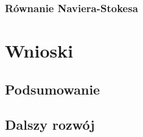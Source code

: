 \documentclass[pdflatex,12pt]{aghdpl}
\begin{document}
		\subsection{Równanie Naviera-Stokesa}






	
\chapter{Wnioski}
	\section{Podsumowanie}
	\section{Dalszy rozwój}

%
%


% 
% 



\end{document}
